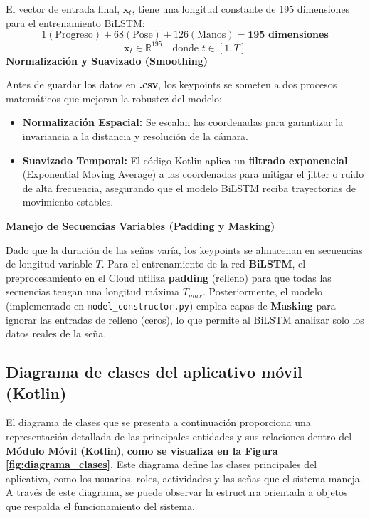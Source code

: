 El vector de entrada final, $\mathbf{x}_t$, tiene una longitud constante de 195 dimensiones para el entrenamiento BiLSTM:
$$ 1 (\text{Progreso}) + 68 (\text{Pose}) + 126 (\text{Manos}) = \mathbf{195 \text{ dimensiones}} $$
$$ \mathbf{x}_t \in \mathbb{R}^{195} \quad \text{donde } t \in [1, T] $$
\textbf{Normalización y Suavizado (Smoothing)}

Antes de guardar los datos en \textbf{.csv}, los keypoints se someten a dos procesos matemáticos que mejoran la robustez del modelo:
\begin{itemize}[
    nosep,
    itemsep=0pt,
    topsep=0pt,
    partopsep=0pt,
    parsep=0pt
]
    \item \textbf{Normalización Espacial:} Se escalan las coordenadas para garantizar la invariancia a la distancia y resolución de la cámara.
    \item \textbf{Suavizado Temporal:} El código Kotlin aplica un \textbf{filtrado exponencial} (Exponential Moving Average) a las coordenadas para mitigar el jitter o ruido de alta frecuencia, asegurando que el modelo BiLSTM reciba trayectorias de movimiento estables.
\end{itemize}

\textbf{Manejo de Secuencias Variables (Padding y Masking)}

Dado que la duración de las señas varía, los keypoints se almacenan en secuencias de longitud variable $T$. Para el entrenamiento de la red \textbf{BiLSTM}, el preprocesamiento en el Cloud utiliza \textbf{padding} (relleno) para que todas las secuencias tengan una longitud máxima $T_{max}$. Posteriormente, el modelo (implementado en \texttt{model\_constructor.py}) emplea capas de \textbf{Masking} para ignorar las entradas de relleno (ceros), lo que permite al BiLSTM analizar solo los datos reales de la seña.

\subsection{Diagrama de clases del aplicativo móvil (Kotlin)}

El diagrama de clases que se presenta a continuación proporciona una representación detallada de las principales entidades y sus relaciones dentro del \textbf{Módulo Móvil (Kotlin)}, \textbf{como se visualiza en la Figura \ref{fig:diagrama_clases}}. Este diagrama define las clases principales del aplicativo, como los usuarios, roles, actividades y las señas que el sistema maneja. A través de este diagrama, se puede observar la estructura orientada a objetos que respalda el funcionamiento del sistema.

